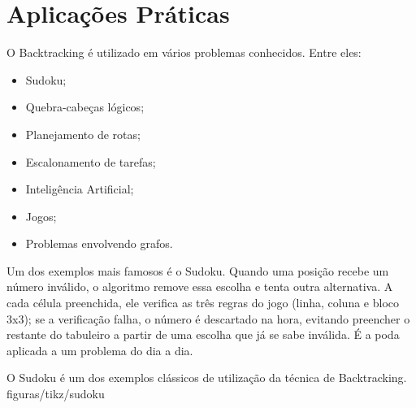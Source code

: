 \section{Aplicações Práticas}

O Backtracking é utilizado em vários problemas conhecidos. Entre eles:

\begin{itemize}[leftmargin=1.4em]
  \item Sudoku;
  \item Quebra-cabeças lógicos;
  \item Planejamento de rotas;
  \item Escalonamento de tarefas;
  \item Inteligência Artificial;
  \item Jogos;
  \item Problemas envolvendo grafos.
\end{itemize}

Um dos exemplos mais famosos é o Sudoku. Quando uma posição recebe um número inválido, o algoritmo remove essa escolha e tenta outra alternativa. A cada célula preenchida, ele verifica as três regras do jogo (linha, coluna e bloco 3x3); se a verificação falha, o número é descartado na hora, evitando preencher o restante do tabuleiro a partir de uma escolha que já se sabe inválida. É a poda aplicada a um problema do dia a dia.

%
  {O Sudoku é um dos exemplos clássicos de utilização da técnica de Backtracking.}%
  {figuras/tikz/sudoku}
